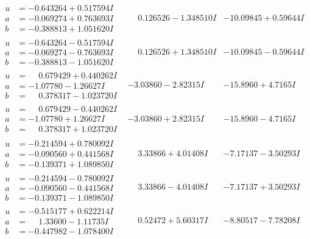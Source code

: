 \documentclass[1p]{elsarticle_modified}
\theoremstyle{definition}
\begin{document}
$$\begin{array}{c|c|c}
\begin{aligned}
u &= -0.643264 + 0.517594 I \\
a &= -0.069274 + 0.763693 I \\
b &= -0.388813 + 1.051620 I\end{aligned}
 & \phantom{-}0.126526 - 1.348510 I & -10.09845 + 0.59644 I \\ \hline\begin{aligned}
u &= -0.643264 - 0.517594 I \\
a &= -0.069274 - 0.763693 I \\
b &= -0.388813 - 1.051620 I\end{aligned}
 & \phantom{-}0.126526 + 1.348510 I & -10.09845 - 0.59644 I \\ \hline\begin{aligned}
u &= \phantom{-}0.679429 + 0.440262 I \\
a &= -1.07780 - 1.26627 I \\
b &= \phantom{-}0.378317 - 1.023720 I\end{aligned}
 & -3.03860 - 2.82315 I & -15.8960 + 4.7165 I \\ \hline\begin{aligned}
u &= \phantom{-}0.679429 - 0.440262 I \\
a &= -1.07780 + 1.26627 I \\
b &= \phantom{-}0.378317 + 1.023720 I\end{aligned}
 & -3.03860 + 2.82315 I & -15.8960 - 4.7165 I \\ \hline\begin{aligned}
u &= -0.214594 + 0.780092 I \\
a &= -0.090560 + 0.441568 I \\
b &= -0.139371 + 1.089850 I\end{aligned}
 & \phantom{-}3.33866 + 4.01408 I & -7.17137 - 3.50293 I \\ \hline\begin{aligned}
u &= -0.214594 - 0.780092 I \\
a &= -0.090560 - 0.441568 I \\
b &= -0.139371 - 1.089850 I\end{aligned}
 & \phantom{-}3.33866 - 4.01408 I & -7.17137 + 3.50293 I \\ \hline\begin{aligned}
u &= -0.515177 + 0.622214 I \\
a &= \phantom{-}1.33600 - 1.11735 I \\
b &= -0.447982 - 1.078400 I\end{aligned}
 & \phantom{-}0.52472 + 5.60317 I & -8.80517 - 7.78208 I \\ \hline\begin{aligned}

\end{aligned}
\end{array}$$
\end{document}
